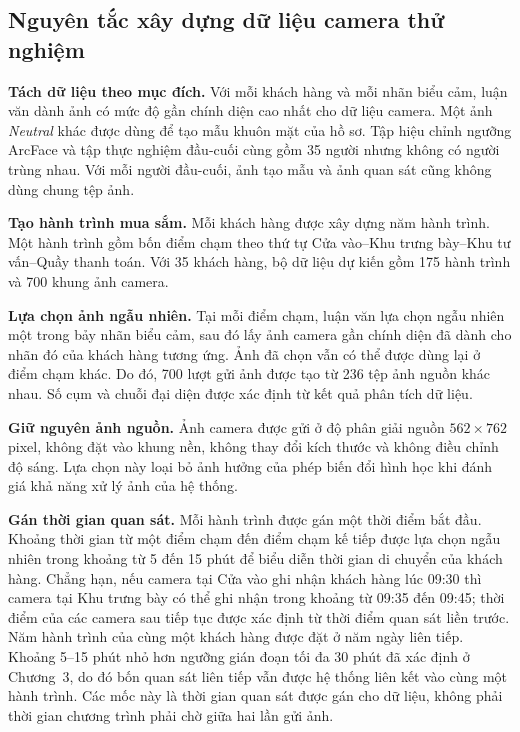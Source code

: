 \documentclass[../LuanVan.tex]{subfiles}
\begin{document}
\subsection{Nguyên tắc xây dựng dữ liệu camera thử nghiệm}
\label{subsection:5.3.2}

\textbf{Tách dữ liệu theo mục đích.} Với mỗi khách hàng và mỗi nhãn biểu cảm, luận văn dành ảnh có mức độ gần chính diện cao nhất cho dữ liệu camera. Một ảnh \textit{Neutral} khác được dùng để tạo mẫu khuôn mặt của hồ sơ. Tập hiệu chỉnh ngưỡng ArcFace và tập thực nghiệm đầu-cuối cùng gồm 35 người nhưng không có người trùng nhau. Với mỗi người đầu-cuối, ảnh tạo mẫu và ảnh quan sát cũng không dùng chung tệp ảnh.

\textbf{Tạo hành trình mua sắm.} Mỗi khách hàng được xây dựng năm hành trình. Một hành trình gồm bốn điểm chạm theo thứ tự Cửa vào--Khu trưng bày--Khu tư vấn--Quầy thanh toán. Với 35 khách hàng, bộ dữ liệu dự kiến gồm 175 hành trình và 700 khung ảnh camera.

\textbf{Lựa chọn ảnh ngẫu nhiên.} Tại mỗi điểm chạm, luận văn lựa chọn ngẫu nhiên một trong bảy nhãn biểu cảm, sau đó lấy ảnh camera gần chính diện đã dành cho nhãn đó của khách hàng tương ứng. Ảnh đã chọn vẫn có thể được dùng lại ở điểm chạm khác. Do đó, 700 lượt gửi ảnh được tạo từ 236 tệp ảnh nguồn khác nhau. Số cụm và chuỗi đại diện được xác định từ kết quả phân tích dữ liệu.

\textbf{Giữ nguyên ảnh nguồn.} Ảnh camera được gửi ở độ phân giải nguồn $562\times762$ pixel, không đặt vào khung nền, không thay đổi kích thước và không điều chỉnh độ sáng. Lựa chọn này loại bỏ ảnh hưởng của phép biến đổi hình học khi đánh giá khả năng xử lý ảnh của hệ thống.

\textbf{Gán thời gian quan sát.} Mỗi hành trình được gán một thời điểm bắt đầu. Khoảng thời gian từ một điểm chạm đến điểm chạm kế tiếp được lựa chọn ngẫu nhiên trong khoảng từ 5 đến 15 phút để biểu diễn thời gian di chuyển của khách hàng. Chẳng hạn, nếu camera tại Cửa vào ghi nhận khách hàng lúc 09:30 thì camera tại Khu trưng bày có thể ghi nhận trong khoảng từ 09:35 đến 09:45; thời điểm của các camera sau tiếp tục được xác định từ thời điểm quan sát liền trước. Năm hành trình của cùng một khách hàng được đặt ở năm ngày liên tiếp. Khoảng 5--15 phút nhỏ hơn ngưỡng gián đoạn tối đa 30 phút đã xác định ở Chương~3, do đó bốn quan sát liên tiếp vẫn được hệ thống liên kết vào cùng một hành trình. Các mốc này là thời gian quan sát được gán cho dữ liệu, không phải thời gian chương trình phải chờ giữa hai lần gửi ảnh.
\end{document}
